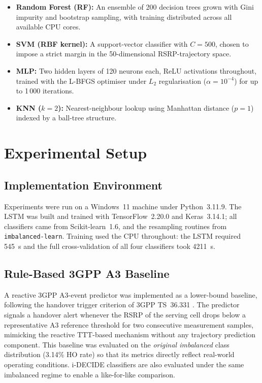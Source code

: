 \documentclass[journal]{IEEEtran}
\begin{document}
\begin{itemize}
  \item \textbf{Random Forest (RF):} An ensemble of 200 decision trees
  grown with Gini impurity and bootstrap sampling, with training
  distributed across all available CPU cores.

  \item \textbf{SVM (RBF kernel):} A support-vector classifier with
  $C=500$, chosen to impose a strict margin in the 50-dimensional
  RSRP-trajectory space.

  \item \textbf{MLP:} Two hidden layers of 120 neurons each, ReLU
  activations throughout, trained with the L-BFGS optimiser under
  $L_2$ regularisation ($\alpha = 10^{-4}$) for up to 1\,000 iterations.

  \item \textbf{KNN ($k=2$):} Nearest-neighbour lookup using Manhattan
  distance ($p=1$) indexed by a ball-tree structure.
\end{itemize}

\section{Experimental Setup}
\label{sec:exp}

\subsection{Implementation Environment}

Experiments were run on a Windows~11 machine under Python~3.11.9.
The LSTM was built and trained with TensorFlow~2.20.0 and
Keras~3.14.1; all classifiers came from Scikit-learn~1.6, and the
resampling routines from \texttt{imbalanced-learn}. Training used the
CPU throughout: the LSTM required \SI{545}{\second} and the full
cross-validation of all four classifiers took \SI{4211}{\second}.

\subsection{Rule-Based 3GPP A3 Baseline}

A reactive 3GPP A3-event predictor was implemented as a lower-bound
baseline, following the handover trigger criterion of 3GPP TS~36.331
\cite{3gpp_36331}. The predictor signals a handover alert whenever the
RSRP of the serving cell drops below a representative A3 reference
threshold for two consecutive measurement samples, mimicking the
reactive TTT-based mechanism without any trajectory prediction component.
This baseline was evaluated on the \emph{original imbalanced} class
distribution (3.14\% HO rate) so that its metrics directly reflect
real-world operating conditions. i-DECIDE classifiers are also evaluated
under the same imbalanced regime to enable a like-for-like comparison.
\end{document}
